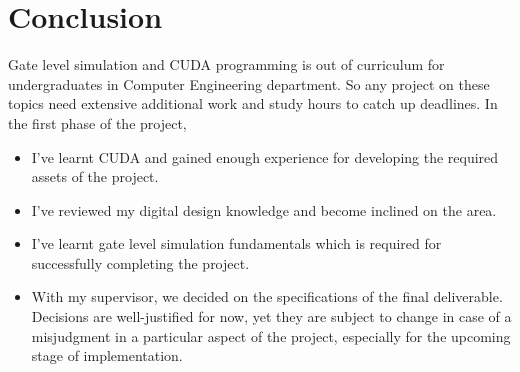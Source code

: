 \documentclass[12pt]{report}
\begin{document}
\section{Conclusion}

Gate level simulation and CUDA programming is out of curriculum for undergraduates in Computer Engineering department. So any project on these topics need extensive additional work and study hours to catch up deadlines. In the first phase of the project,
\begin{itemize}
\item I've learnt CUDA and gained enough experience for developing the required assets of the project.
\item I've reviewed my digital design knowledge and become inclined on the area.
\item I've learnt gate level simulation fundamentals which is required for successfully completing the project.
\item With my supervisor, we decided on the specifications of the final deliverable. Decisions are well-justified for now, yet they are subject to change in case of a misjudgment in a particular aspect of the project, especially for the upcoming stage of implementation.  
\end{itemize}
\end{document}
